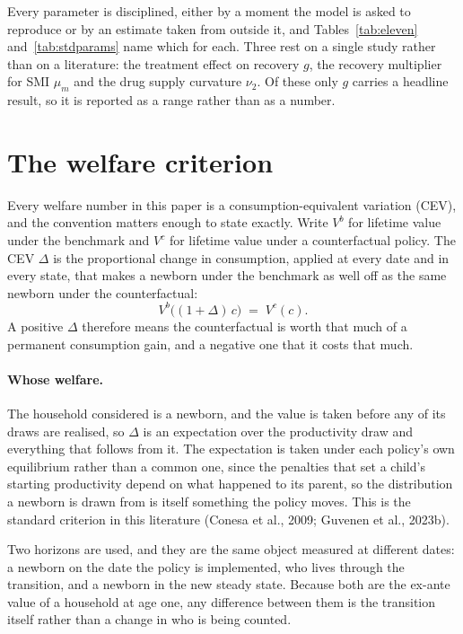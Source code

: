 \documentclass[10pt]{article}
\begin{document}
Every parameter is disciplined, either by a moment the model is asked to
reproduce or by an estimate taken from outside it, and
Tables~\ref{tab:eleven} and~\ref{tab:stdparams} name which for each. Three rest on a
single study rather than on a literature: the treatment effect on recovery $g$, the
recovery multiplier for SMI $\mu_m$ and the drug supply curvature $\nu_2$. Of these
only $g$ carries a headline result, so it is reported as a range rather than as a
number.


\section{The welfare criterion}\label{sec:cev}

Every welfare number in this paper is a consumption-equivalent variation (CEV), and the
convention matters enough to state exactly. Write
$V^{b}$ for lifetime value under the benchmark and $V^{c}$ for lifetime value under a
counterfactual policy. The CEV $\Delta$ is the proportional change in
consumption, applied at every date and in every state, that makes a newborn under
the benchmark as well off as the same newborn under the counterfactual:
%
\begin{equation}\label{eq:cev}
V^{b}\big((1+\Delta)\,c\big)\;=\;V^{c}(c) .
\end{equation}
%
A positive $\Delta$ therefore means the counterfactual is worth that much of a
permanent consumption gain, and a negative one that it costs that much.

\paragraph{Whose welfare.} The household considered is a newborn, and the value is taken before
any of its draws are realised, so $\Delta$ is an expectation over the productivity
draw and everything that follows from it. The expectation is taken under each policy's
own equilibrium rather than a common one, since the penalties that set a child's
starting productivity depend on what happened to its parent, so the distribution a
newborn is drawn from is itself something the policy moves. This is the standard
criterion in this literature (Conesa et al., 2009; Guvenen et al., 2023b).

Two horizons are used, and they are the same object measured at different dates: a
newborn on the date the policy is implemented, who lives through the transition, and
a newborn in the new steady state. Because both are the ex-ante value of a household
at age one, any difference between them is the transition itself rather than a change
in who is being counted.
\end{document}
